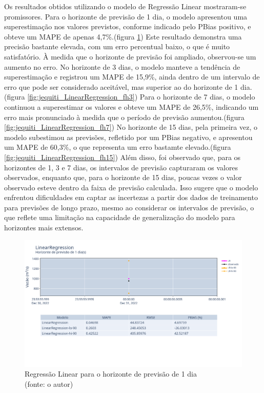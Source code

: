 Os resultados obtidos utilizando o modelo de Regressão Linear mostraram-se promissores. Para o horizonte de previsão de 1 dia, o modelo apresentou uma superestimação nos valores previstos, conforme indicado pelo PBias positivo, e obteve um MAPE de apenas 4,7\%.(figura \ref{fig:jequiti_LinearRegression_fh1}) Este resultado demonstra uma precisão bastante elevada, com um erro percentual baixo, o que é muito satisfatório. À medida que o horizonte de previsão foi ampliado, observou-se um aumento no erro. No horizonte de 3 dias, o modelo manteve a tendência de superestimação e registrou um MAPE de 15,9\%, ainda dentro de um intervalo de erro que pode ser considerado aceitável, mas superior ao do horizonte de 1 dia.(figura \ref{fig:jequiti_LinearRegression_fh3}) Para o horizonte de 7 dias, o modelo continuou a superestimar os valores e obteve um MAPE de 26,5\%, indicando um erro mais pronunciado à medida que o período de previsão aumentou.(figura \ref{fig:jequiti_LinearRegression_fh7}) No horizonte de 15 dias, pela primeira vez, o modelo subestimou as previsões, refletido por um PBias negativo, e apresentou um MAPE de 60,3\%, o que representa um erro bastamte elevado.(figura \ref{fig:jequiti_LinearRegression_fh15}) Além disso, foi observado que, para os horizontes de 1, 3 e 7 dias, os intervalos de previsão capturaram os valores observados, enquanto que, para o horizonte de 15 dias, poucas vezes o valor observado esteve dentro da faixa de previsão calculada. Isso sugere que o modelo enfrentou dificuldades em captar as incertezas a partir dos dados de treinamento para previsões de longo prazo, mesmo ao considerar os intervalos de previsão, o que reflete uma limitação na capacidade de generalização do modelo para horizontes mais extensos.

\begin{figure}[!h]
	\centering
	\includegraphics[scale=0.33]{Figuras/jequiti/resultados/LinearRegression_fh1.png}
	\caption{Regressão Linear para o horizonte de previsão de 1 dia\\(fonte: o autor)}
	\label{fig:jequiti_LinearRegression_fh1}
\end{figure}

